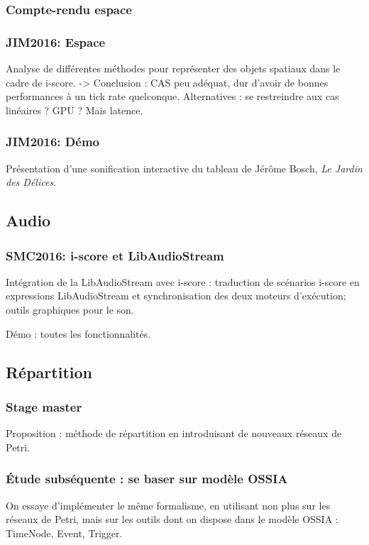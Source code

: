 \documentclass[french,a4paper,openany,12pt]{book}
\begin{document}
\subsubsection{Compte-rendu espace}

\subsubsection{JIM2016: Espace}
Analyse de différentes méthodes pour représenter des objets spatiaux dans le cadre de i-score.
-> Conclusion : CAS peu adéquat, dur d'avoir de bonnes performances à un tick rate quelconque.
Alternatives : se restreindre aux cas linéaires ? 
GPU ? Mais latence.

\subsubsection{JIM2016: Démo}
Présentation d'une sonification interactive du tableau de Jérôme Bosch, \textit{Le Jardin des Délices}.

\subsection{Audio}
\subsubsection{SMC2016: i-score et LibAudioStream}
Intégration de la LibAudioStream avec i-score : traduction 
de scénarios i-score en expressions LibAudioStream et synchronisation
des deux moteurs d'exécution; outils graphiques pour le son.

Démo : toutes les fonctionnalités.

\subsection{Répartition}
\subsubsection{Stage master}
Proposition : méthode de répartition en introduisant de nouveaux réseaux de Petri.

\subsubsection{Étude subséquente : se baser sur modèle OSSIA}
On essaye d'implémenter le même formalisme, en utilisant non plus sur les réseaux de Petri, 
mais sur les outils dont on dispose dans le modèle OSSIA : TimeNode, Event, Trigger.
\end{document}
